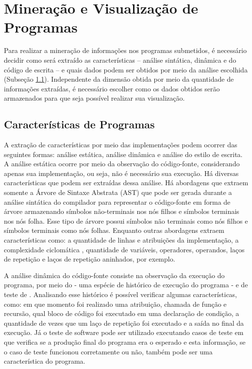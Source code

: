 	\section{Mineração e Visualização de Programas}
	\label{sec:MinVisual}
		Para realizar a mineração de informações nos programas submetidos, é necessário
		decidir como será extraído as características -- análise sintática, dinâmica e
		do código de escrita -- e quais dados podem ser obtidos por meio da análise
		escolhida (Subseção \ref{subSec:Caracteristicas}). Independente da dimensão
		obtida por meio da quantidade de informações extraídas, é necessário escolher
		como os dados obtidos serão armazenados para que seja possível realizar sua visualização.
		
		\subsection{Características de Programas}
		\label{subSec:Caracteristicas}

			A extração de características por meio das implementações podem ocorrer das
			seguintes formas: análise estática, análise dinâmica e análise do estilo de escrita.
			A análise estática ocorre por meio da observação do código-fonte, considerando
			apenas sua implementação, ou seja, não é necessário sua execução. Há diversas
			características que podem ser extraídas dessa análise. Há abordagens que extraem
			somente a Árvore de Sintaxe Abstrata (AST) que pode ser gerada durante a análise
			sintática do compilador para representar o código-fonte em forma de árvore
			armazenando símbolos não-terminais nos nós filhos e símbolos terminais nos
			nós folha. Esse tipo de árvore possui símbolos não terminais como nós filhos
			e símbolos terminais como nós folhas. Enquanto outras abordagens extraem
			características como: a quantidade de linhas e atribuições da implementação,
			a complexidade ciclomática \cite{mccabe}, quantidade de variáveis, operadores,
			operandos, laços de repetição e laços de repetição aninhados, por exemplo.
			
			A análise dinâmica do código-fonte consiste na observação da execução do
			programa, por meio do  - uma espécie de histórico de execução
			do programa - e de teste de . Analisando esse histórico é
			possível verificar algumas características, como: em que momento foi realizado
			uma atribuição, chamada de função e recursão, qual bloco de código foi
			executado em uma declaração de condição, a quantidade de vezes que um laço
			de repetição foi executado e a saída no final da execução. Já o teste de
			software pode ser utilizado executando casos de teste em que verifica se a
			produção final do programa era o esperado e esta informação, se o caso de
			teste funcionou corretamente ou não, também pode ser uma característica do programa.
			
